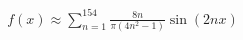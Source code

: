 \documentclass[preview]{standalone}
\begin{document}
\begin{align*}
f(x) \approx \sum_{n=1}^{154} \frac{8n}{\pi(4n^2-1)} \sin(2nx)
\end{align*}
\end{document}
